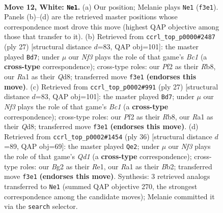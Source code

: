 \documentclass[11pt]{article}
\begin{document}
\clearpage

\begin{figure}[p]\centering
\begin{subfigure}{0.46\textwidth}\centering
\resizebox{\linewidth}{!}{%
\newchessgame
\chessboard[
  setfen={r1bqkb1r/1pp5/1nn3p1/4pp1p/p6P/2NP1NP1/PP1BPPB1/R2Q1R1K w kq - 0 12},
  showmover=false,
  pgfstyle=straightmove, color=movearrow, markmove={f3-e1}
]}
\caption{}
\end{subfigure}\hfill
\begin{subfigure}{0.46\textwidth}\centering
\resizebox{\linewidth}{!}{%
\newchessgame
\chessboard[
  setfen={1rbqr1k1/1pn2pbp/p2p1np1/P1pP4/4P3/2N4P/1P1NBPP1/R1BQR1K1 b - - 0 14},
  showmover=false,
  pgfstyle=straightmove, color=movearrow, markmove={c8-d7}
]}
\caption{}
\end{subfigure}
\\[4pt]
\begin{subfigure}{0.46\textwidth}\centering
\resizebox{\linewidth}{!}{%
\newchessgame
\chessboard[
  setfen={1rbqr1k1/1pn2pbp/p2p1np1/P1pP4/4P3/2N4P/1P1NBPP1/R1BQR1K1 b - - 0 14},
  showmover=false,
  pgfstyle=straightmove, color=movearrow, markmove={c8-d7}
]}
\caption{}
\end{subfigure}\hfill
\begin{subfigure}{0.46\textwidth}\centering
\resizebox{\linewidth}{!}{%
\newchessgame
\chessboard[
  setfen={1r1qrbk1/1b3pp1/p4n1p/npp1p3/4P3/2PPN2P/PBBN1PP1/R2QR1K1 w - - 6 19},
  showmover=false,
  pgfstyle=straightmove, color=movearrow, markmove={d1-e2}
]}
\caption{}
\end{subfigure}
\caption{\textbf{Move 12, White: \texttt{Ne1}.} (a) Our position; Melanie plays \texttt{Ne1} (\texttt{f3e1}). Panels (b)--(d) are the retrieved master positions whose correspondence most drove this move (highest QAP objective among those that transfer to it). (b) Retrieved from \texttt{ccrl\_top\_p0000\#2487} (ply 27) [structural distance $d$=83, QAP obj=101]: the master played \texttt{Bd7}; under $\mu$ our \emph{Nf3} plays the role of that game's \emph{Bc1} (a \textbf{cross-type} correspondence); cross-type roles: our \emph{P}f2 as their \emph{R}b8, our \emph{R}a1 as their \emph{Q}d8; transferred move \texttt{f3e1} \textbf{(endorses this move)}. (c) Retrieved from \texttt{ccrl\_top\_p0002\#991} (ply 27) [structural distance $d$=83, QAP obj=101]: the master played \texttt{Bd7}; under $\mu$ our \emph{Nf3} plays the role of that game's \emph{Bc1} (a \textbf{cross-type} correspondence); cross-type roles: our \emph{P}f2 as their \emph{R}b8, our \emph{R}a1 as their \emph{Q}d8; transferred move \texttt{f3e1} \textbf{(endorses this move)}. (d) Retrieved from \texttt{ccrl\_top\_p0002\#1454} (ply 36) [structural distance $d$=89, QAP obj=69]: the master played \texttt{Qe2}; under $\mu$ our \emph{Nf3} plays the role of that game's \emph{Qd1} (a \textbf{cross-type} correspondence); cross-type roles: our \emph{B}g2 as their \emph{R}e1, our \emph{R}a1 as their \emph{B}b2; transferred move \texttt{f3e1} \textbf{(endorses this move)}. Synthesis: 3 retrieved analogs transferred to \texttt{Ne1} (summed QAP objective 270, the strongest correspondence among the candidate moves); Melanie committed it via the \texttt{search} selector.}

\end{figure}
\end{document}
